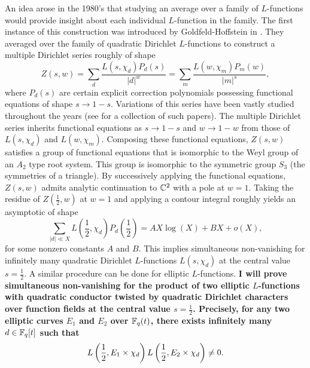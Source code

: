 \documentclass[12pt,reqno,oneside]{amsart}
\begin{document}
An idea arose in the 1980's that studying an average over a family of $L$-functions would provide insight about each individual $L$-function in the family. The first instance of this construction was introduced by Goldfeld-Hoffstein in \cite{GH}. They averaged over the family of quadratic Dirichlet $L$-functions to construct a multiple Dirichlet series roughly of shape
\[
  Z(s,w) = \sum_{d}\frac{L(s,\chi_{d})P_{d}(s)}{|d|^{w}} = \sum_{m}\frac{L(w,\chi_{m})P_{m}(w)}{|m|^{s}},
\]
where $P_{d}(s)$ are certain explicit correction polynomials possessing functional equations of shape $s \to 1-s$. Variations of this series have been vastly studied throughout the years (see \cite{BW} for a collection of such papers). The multiple Dirichlet series inherits functional equations as $s \to 1-s$ and $w \to 1-w$ from those of $L(s,\chi_{d})$ and $L(w,\chi_{m})$. Composing these functional equations, $Z(s,w)$ satisfies a group of functional equations that is isomorphic to the Weyl group of an $A_{2}$ type root system. This group is isomorphic to the symmetric group $S_{3}$ (the symmetries of a triangle). By successively applying the functional equations, $Z(s,w)$ admits analytic continuation to $\mathbb{C}^{2}$ with a pole at $w = 1$. Taking the residue of $Z\left(\frac{1}{2},w\right)$ at $w = 1$ and applying a contour integral roughly yields an asymptotic of shape
\begin{equation}\label{equ:asymptotic}
  \sum_{|d| \ll X}L\left(\frac{1}{2},\chi_{d}\right)P_{d}\left(\frac{1}{2}\right) = AX\log(X)+BX+o(X),
\end{equation}
for some nonzero constants $A$ and $B$. This implies simultaneous non-vanishing for infinitely many quadratic Dirichlet $L$-functions $L(s,\chi_{d})$ at the central value $s = \frac{1}{2}$. A similar procedure can be done for elliptic $L$-functions. \textbf{I will prove simultaneous non-vanishing for the product of two elliptic $L$-functions with quadratic conductor twisted by quadratic Dirichlet characters over function fields at the central value $s = \frac{1}{2}$. Precisely, for any two elliptic curves $E_{1}$ and $E_{2}$ over $\mathbb{F}_{q}(t)$, there exists infinitely many $d \in \mathbb{F}_{q}[t]$ such that
\[
  L\left(\frac{1}{2},E_{1} \times \chi_{d}\right)L\left(\frac{1}{2},E_{2} \times \chi_{d}\right) \neq 0.
\]}
\end{document}
